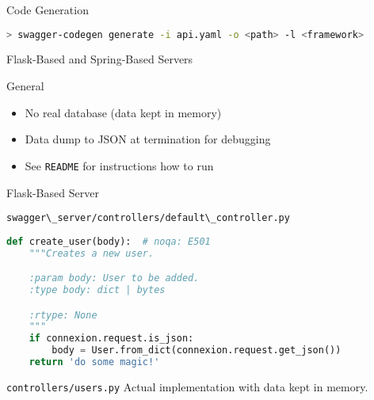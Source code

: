 \begin{frame}[fragile]{Code Generation}
\begin{lstlisting}[language=bash,style=mini]
> swagger-codegen generate -i api.yaml -o <path> -l <framework>
\end{lstlisting}

\end{frame}


\begin{frame}{Flask-Based and Spring-Based Servers}
    \begin{block}{General}
        \begin{itemize}
            \item No real database (data kept in memory)
            \item Data dump to JSON at termination for debugging
            \item See \lstinline{README} for instructions how to run
        \end{itemize}
    \end{block}
\end{frame}


\begin{frame}[fragile]{Flask-Based Server}
\begin{block}{\lstinline{swagger\_server/controllers/default\_controller.py}}
\begin{lstlisting}[language=python,style=mini]
def create_user(body):  # noqa: E501
    """Creates a new user.

    :param body: User to be added.
    :type body: dict | bytes

    :rtype: None
    """
    if connexion.request.is_json:
        body = User.from_dict(connexion.request.get_json())
    return 'do some magic!'
\end{lstlisting}
\end{block}

    \begin{block}{\lstinline{controllers/users.py}}
        Actual implementation with data kept in memory.
    \end{block}
\end{frame}


